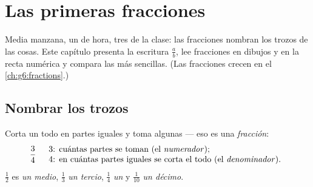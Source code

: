 \chapter{Las primeras fracciones}\label{ch:g4:fractions}

Media manzana, un  de hora, tres  de la clase:
las fracciones nombran los trozos de las cosas. Este capítulo presenta la
escritura $\frac{a}{b}$, lee fracciones en dibujos y en la recta numérica
y compara las más sencillas. (Las fracciones crecen en el
\cref{ch:g6:fractions}.)

\section{Nombrar los trozos}

\begin{definition}[Fracción]\label{def:g4:fractions:def}
Corta un todo en partes iguales y toma algunas --- eso es una
\emph{fracción}:
\[
\frac{3}{4}
\quad
\begin{array}{l}
3 \text{: cuántas partes se toman (el \emph{numerador}\index{numerador});}\\
4 \text{: en cuántas partes iguales se corta el todo (el
\emph{denominador}\index{denominador}).}
\end{array}
\]
$\frac12$ es \emph{un medio}, $\frac13$ \emph{un tercio}, $\frac14$
\emph{un } y $\frac{1}{10}$ \emph{un décimo}.
\end{definition}

